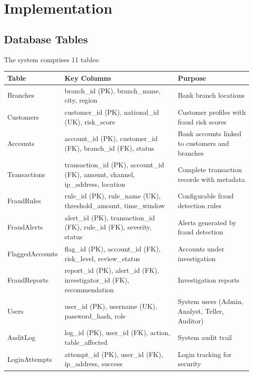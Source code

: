 \documentclass[a4paper,12pt]{article}
\begin{document}
\newpage

\section{Implementation}

\subsection{Database Tables}
The system comprises 11 tables:

\begin{longtable}{|p{3.5cm}|p{4cm}|p{6cm}|}
\hline
\textbf{Table} & \textbf{Key Columns} & \textbf{Purpose} \\
\hline
Branches & branch\_id (PK), branch\_name, city, region & Bank branch locations \\
\hline
Customers & customer\_id (PK), national\_id (UK), risk\_score & Customer profiles with fraud risk scores \\
\hline
Accounts & account\_id (PK), customer\_id (FK), branch\_id (FK), status & Bank accounts linked to customers and branches \\
\hline
Transactions & transaction\_id (PK), account\_id (FK), amount, channel, ip\_address, location & Complete transaction records with metadata \\
\hline
FraudRules & rule\_id (PK), rule\_name (UK), threshold\_amount, time\_window & Configurable fraud detection rules \\
\hline
FraudAlerts & alert\_id (PK), transaction\_id (FK), rule\_id (FK), severity, status & Alerts generated by fraud detection \\
\hline
FlaggedAccounts & flag\_id (PK), account\_id (FK), risk\_level, review\_status & Accounts under investigation \\
\hline
FraudReports & report\_id (PK), alert\_id (FK), investigator\_id (FK), recommendation & Investigation reports \\
\hline
Users & user\_id (PK), username (UK), password\_hash, role & System users (Admin, Analyst, Teller, Auditor) \\
\hline
AuditLog & log\_id (PK), user\_id (FK), action, table\_affected & System audit trail \\
\hline
LoginAttempts & attempt\_id (PK), user\_id (FK), ip\_address, success & Login tracking for security \\
\hline
\end{longtable}
\end{document}

